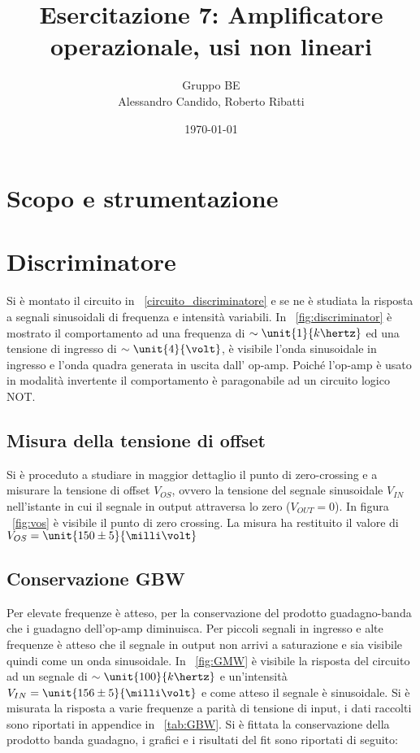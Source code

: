 \documentclass[10pt,a4paper]{article}
\title{Esercitazione 7: Amplificatore operazionale, usi non lineari}
\author{Gruppo BE \\ Alessandro Candido, Roberto Ribatti}
\date{\today}
\begin{document}
\maketitle

\section{Scopo e strumentazione}

\section{Discriminatore}
Si è montato il circuito in \figurename{~\ref{circuito_discriminatore}} e se ne è studiata la risposta a segnali sinusoidali di frequenza e intensità variabili. In \figurename{~\ref{fig:discriminator}} è mostrato il comportamento ad una frequenza di $\sim \unit{1}{k\hertz}$ ed una tensione di ingresso di $\sim\unit{4}{\volt}$, è visibile l'onda sinusoidale in ingresso e l'onda quadra generata in uscita dall' op-amp. Poiché l'op-amp è usato in modalità invertente il comportamento è paragonabile ad un circuito logico NOT.

\subsection{Misura della tensione di offset}
Si è proceduto a studiare in maggior dettaglio il punto di zero-crossing e a misurare la tensione di offset $V_{OS}$, ovvero la tensione del segnale sinusoidale $V_{IN}$ nell'istante in cui il segnale in output attraversa lo zero ($V_{OUT}=0$). In figura \figurename{~\ref{fig:vos}} è visibile il punto di zero crossing. La misura ha restituito il valore di $V_{OS} = \unit{150 \pm 5}{\milli\volt}$

\subsection{Conservazione GBW}
Per elevate frequenze è atteso, per la conservazione del prodotto guadagno-banda che i guadagno dell'op-amp diminuisca. Per piccoli segnali in ingresso e alte frequenze è atteso che il segnale in output non arrivi a saturazione e sia visibile quindi come un onda sinusoidale.
In \figurename{~\ref{fig:GMW}} è visibile la risposta del circuito ad un segnale di $\sim\unit{100}{k\hertz}$ e un'intensità $V_{IN}= \unit{156 \pm 5}{\milli\volt}$ e come atteso il segnale è sinusoidale.
Si è misurata la risposta a varie frequenze a parità di tensione di input, i dati raccolti sono riportati in appendice in \tablename{~\ref{tab:GBW}}. Si è fittata la conservazione della prodotto banda guadagno, i grafici e i risultati del fit sono riportati di seguito:
\end{document}

